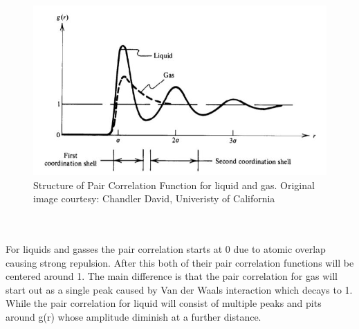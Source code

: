 \documentclass[a4paper,12pt]{article} %
\begin{document}
\begin{figure}[!h]
    \centering
    \includegraphics[width=0.63\linewidth]{Images/PairCorr.JPG}
    \caption{Structure of Pair Correlation Function for liquid and gas. Original image courtesy: Chandler David, Univeristy of California \cite{chandler}}
    \label{fig:my_label}
\end{figure}\\
\\
For liquids and gasses the pair correlation starts at 0 due to atomic overlap causing strong repulsion. After this both of their pair correlation functions will be centered around 1. The main difference is that the pair correlation for gas will start out as a single peak caused by Van der Waals interaction which decays to 1. While the pair correlation for liquid will consist of multiple peaks and pits around g(r) whose amplitude diminish at a further distance.\cite{chandler}
\end{document}
